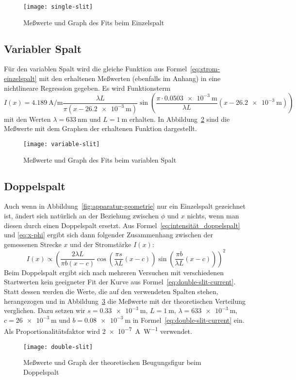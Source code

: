 \begin{figure}
  \centering
  \texttt{[image: single-slit]}
  \caption{Meßwerte und Graph des Fits beim Einzelspalt}
  \label{fig:single-slit}
\end{figure}

\subsection{Variabler Spalt}

Für den variablen Spalt wird die gleiche Funktion aus
Formel~\eqref{eq:strom-einzelspalt} mit den erhaltenen Meßwerten
(ebenfalls im Anhang) in eine nichtlineare Regression gegeben. Es
wird Funktionsterm
%
\begin{equation}
  \label{eq:variable-slit-fit}
  I(x) = \SI{4.189}{\ampere\per\metre}
  \frac{\lambda L}{\pi(x-\SI{26.2e-3}{\metre})}
  \sin\left(\frac{\pi\cdot\SI{0.0503e-3}{\metre}}{\lambda L} 
    (x-\SI{26.2e-3}{\metre})\right)
\end{equation}
%
mit den Werten $\lambda = \SI{633}{\nano\metre}$ und $L =
\SI{1}{\metre}$ erhalten.  In Abbildung~\ref{fig:variable-slit} sind die
Meßwerte mit dem Graphen der erhaltenen Funktion dargestellt.

\begin{figure}
  \centering
  \texttt{[image: variable-slit]}
  \caption{Meßwerte und Graph des Fits beim variablen Spalt}
  \label{fig:variable-slit}
\end{figure}

\subsection{Doppelspalt}

Auch wenn in Abbildung~\ref{fig:apparatur-geometrie} nur ein Einzelspalt
gezeichnet ist, ändert sich natürlich an der Beziehung zwischen $\phi$
und $x$ nichts, wenn man diesen durch einen Doppelspalt ersetzt. Aus
Formel~\eqref{eq:intensität_doppelspalt} und \eqref{eq:x-phi} ergibt
sich dann folgender Zusammenhang zwischen der gemessenen Strecke $x$ und
der Stromstärke $I(x)$:
%
\begin{equation}
  \label{eq:double-slit-current}
  I(x) \propto \left( \frac{2\lambda L}{\pi b(x-c)}
    \cos\left(\frac{\pi s}{\lambda L} (x-c)\right)
    \sin\left(\frac{\pi b}{\lambda L} (x-c)\right) \right)^2
\end{equation}
Beim Doppelspalt ergibt sich nach mehreren Versuchen mit verschiedenen
Startwerten kein geeigneter Fit der Kurve aus
Formel~\eqref{eq:double-slit-current}. Statt dessen werden die Werte,
die auf den verwendeten Spalten stehen, herangezogen und in
Abbildung~\ref{fig:double-slit} die Meßwerte mit der theoretischen
Verteilung verglichen. Dazu setzen wir $s = \SI{0.33e-3}{\metre}$, $L =
\SI{1}{\metre}$, $\lambda = \SI{633e-3}{\metre}$, $c =
\SI{26e-3}{\metre}$ und $b = \SI{0.08e-3}{\metre}$ in
Formel~\eqref{eq:double-slit-current} ein. Als Proportionalitätsfaktor
wird \SI[exponent-to-prefix = false,
per-mode=symbol]{2e-7}{\ampere\per\watt} verwendet.

\begin{figure}
  \centering
  \texttt{[image: double-slit]}
  \caption{Meßwerte und Graph der theoretischen Beugungsfigur beim Doppelspalt}
  \label{fig:double-slit}
\end{figure}
